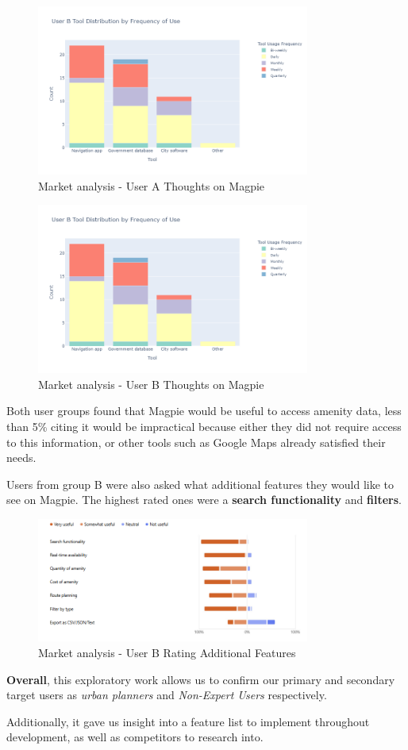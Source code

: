 \begin{figure}[htbp]
    \centering{}
    \includegraphics[width=0.8\textwidth]{images/mr-userb-tool-freq.png}
    \caption{Market analysis - User A Thoughts on Magpie}
\end{figure}

\begin{figure}[htbp]
    \centering{}
    \includegraphics[width=0.8\textwidth]{images/mr-userb-tool-freq.png}
    \caption{Market analysis - User B Thoughts on Magpie}
\end{figure}

Both user groups found that Magpie would be useful to access amenity data, less
than 5\% citing it would be impractical because either they did not require
access to this information, or other tools such as Google Maps already satisfied
their needs.

Users from group B were also asked what additional features they would like to
see on Magpie. The highest rated ones were a \textbf{search functionality} and
\textbf{filters}.

\begin{figure}[htbp]
    \centering{}
    \includegraphics[width=0.8\textwidth]{images/mr-extra-features.png}
    \caption{Market analysis - User B Rating Additional Features}
\end{figure}

\textbf{Overall}, this exploratory work allows us to confirm our primary and
secondary target users as \emph{urban planners} and \emph{Non-Expert Users}
respectively.

Additionally, it gave us insight into a feature list to implement throughout
development, as well as competitors to research into.